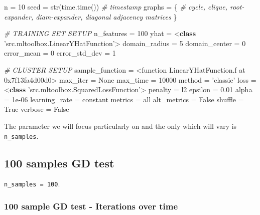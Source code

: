 \documentclass[11pt]{article}
\newenvironment{Shaded}{}{}
\newcommand{\KeywordTok}[1]{\textcolor[rgb]{0.00,0.44,0.13}{\textbf{{#1}}}}
\newcommand{\DecValTok}[1]{\textcolor[rgb]{0.25,0.63,0.44}{{#1}}}
\newcommand{\BaseNTok}[1]{\textcolor[rgb]{0.25,0.63,0.44}{{#1}}}
\newcommand{\FloatTok}[1]{\textcolor[rgb]{0.25,0.63,0.44}{{#1}}}
\newcommand{\StringTok}[1]{\textcolor[rgb]{0.25,0.44,0.63}{{#1}}}
\newcommand{\CommentTok}[1]{\textcolor[rgb]{0.38,0.63,0.69}{\textit{{#1}}}}
\newcommand{\NormalTok}[1]{{#1}}
\newcommand{\VariableTok}[1]{\textcolor[rgb]{0.10,0.09,0.49}{{#1}}}
\newcommand{\OperatorTok}[1]{\textcolor[rgb]{0.40,0.40,0.40}{{#1}}}
\newcommand{\BuiltInTok}[1]{{#1}}
\begin{document}
\begin{Shaded}
\begin{Highlighting}[]
\NormalTok{n }\OperatorTok{=} \DecValTok{10}
\NormalTok{seed }\OperatorTok{=} \BuiltInTok{str}\NormalTok{(time.time()) }\CommentTok{# timestamp}
\NormalTok{graphs }\OperatorTok{=}\NormalTok{ \{}
    \CommentTok{# cycle, clique, root-expander, diam-expander, diagonal adjacency matrices}
\NormalTok{\}}

\CommentTok{# TRAINING SET SETUP}
\NormalTok{n_features }\OperatorTok{=} \DecValTok{100}
\NormalTok{yhat }\OperatorTok{=} \OperatorTok{<}\KeywordTok{class} \StringTok{'src.mltoolbox.LinearYHatFunction'}\OperatorTok{>}
\NormalTok{domain_radius }\OperatorTok{=} \DecValTok{5}
\NormalTok{domain_center }\OperatorTok{=} \DecValTok{0}
\NormalTok{error_mean }\OperatorTok{=} \DecValTok{0}
\NormalTok{error_std_dev }\OperatorTok{=} \DecValTok{1}

\CommentTok{# CLUSTER SETUP}
\NormalTok{sample_function }\OperatorTok{=} \OperatorTok{<}\NormalTok{function LinearYHatFunction.f at }\BaseNTok{0x7f13fa4d00d0}\OperatorTok{>}
\NormalTok{max_iter }\OperatorTok{=} \VariableTok{None}
\NormalTok{max_time }\OperatorTok{=} \DecValTok{10000}
\NormalTok{method }\OperatorTok{=} \StringTok{'classic'}
\NormalTok{loss }\OperatorTok{=} \OperatorTok{<}\KeywordTok{class} \StringTok{'src.mltoolbox.SquaredLossFunction'}\OperatorTok{>}
\NormalTok{penalty }\OperatorTok{=}\NormalTok{ l2}
\NormalTok{epsilon }\OperatorTok{=} \FloatTok{0.01}
\NormalTok{alpha }\OperatorTok{=} \FloatTok{1e-06}
\NormalTok{learning_rate }\OperatorTok{=}\NormalTok{ constant}
\NormalTok{metrics }\OperatorTok{=} \BuiltInTok{all}
\NormalTok{alt_metrics }\OperatorTok{=} \VariableTok{False}
\NormalTok{shuffle }\OperatorTok{=} \VariableTok{True}
\NormalTok{verbose }\OperatorTok{=} \VariableTok{False}
\end{Highlighting}
\end{Shaded}

    The parameter we will focus particularly on and the only which will vary
is \texttt{n\_samples}.

    \subsection{100 samples GD test}\label{samples-gd-test}

\texttt{n\_samples\ =\ 100}.

    \subsubsection{100 sample GD test - Iterations over
time}\label{sample-gd-test---iterations-over-time}
\end{document}
